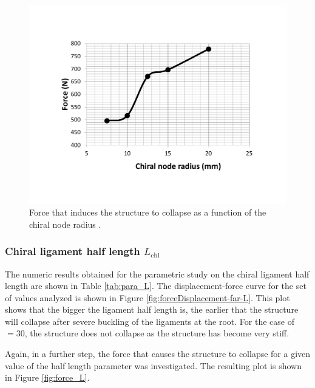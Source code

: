       \begin{figure}[!htpb] %
        \centering
        \includegraphics[width=0.8 \textwidth]{../figures/result-sim/r/force_r}
        \caption[Force that induces the structure to collapse as a function of the chiral node depth]{Force that induces the structure to collapse as a function of the chiral node radius \chir.}\label{fig:force_r}
      \end{figure}

    \clearpage
    \subsubsection{Chiral ligament half length $L_{\mathrm{chi}}$}

      The numeric results obtained for the parametric study on the chiral ligament half length \chiL are shown in Table \ref{tab:para_L}. The displacement-force curve for the set of values analyzed is shown in Figure \ref{fig:forceDisplacement-far-L}. This plot shows that the bigger the ligament half length is, the earlier that the structure will collapse after severe buckling of the ligaments at the root. For the case of \chiL$= 30$, the structure does not collapse as the structure has become very stiff.

      Again, in a further step, the force that causes the structure to collapse for a given value of the half length \chiL parameter was investigated. The resulting plot is shown in Figure \ref{fig:force_L}.

